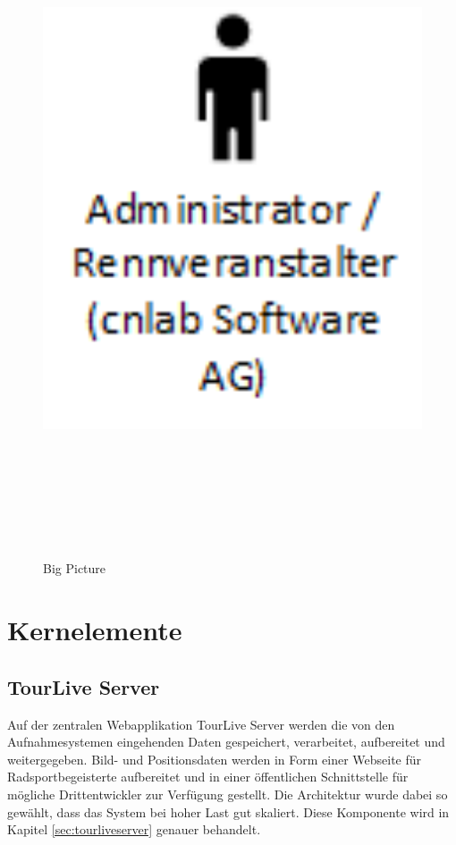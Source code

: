 \begin{figure}[H]
	\centering
	\includegraphics[height=200mm]{images/BigPicture.png}
	\caption{Big Picture}
	\label{fig:bigpicture}
\end{figure}

\pagebreak

\section{Kernelemente}
\subsection{TourLive Server}
Auf der zentralen Webapplikation TourLive Server werden die von den Aufnahmesystemen eingehenden Daten gespeichert, verarbeitet, aufbereitet und weitergegeben. Bild- und Positionsdaten werden in Form einer Webseite für Radsportbegeisterte aufbereitet und in einer öffentlichen Schnittstelle für mögliche Drittentwickler zur Verfügung gestellt. Die Architektur wurde dabei so gewählt, dass das System bei hoher Last gut skaliert. Diese Komponente wird in Kapitel \ref{sec:tourliveserver} genauer behandelt.

